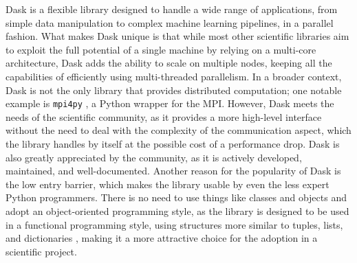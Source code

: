 
Dask is a flexible library designed to handle a wide range of applications, from
simple data manipulation to complex machine learning pipelines, in a parallel
fashion. What makes Dask unique is that while most other scientific libraries
aim to exploit the full potential of a single machine by relying on a multi-core
architecture, Dask adds the ability to scale on multiple nodes, keeping all the
capabilities of efficiently using multi-threaded parallelism. In a broader
context, Dask is not the only library that provides distributed computation; one
notable example is \texttt{mpi4py} \cite{Dalcin2021}, a Python wrapper for the
MPI. However, Dask meets the needs of the scientific community, as it provides a
more high-level interface without the need to deal with the complexity of the
communication aspect, which the library handles by itself at the possible cost
of a performance drop.  Dask is also greatly appreciated by the community, as it
is actively developed, maintained, and well-documented. Another reason for the
popularity of Dask is the low entry barrier, which makes the library usable by
even the less expert Python programmers. There is no need to use things like
classes and objects and adopt an object-oriented programming style, as the
library is designed to be used in a functional programming style, using
structures more similar to tuples, lists, and dictionaries  \cite{dask2015},
making it a more attractive choice for the adoption in a scientific project.

